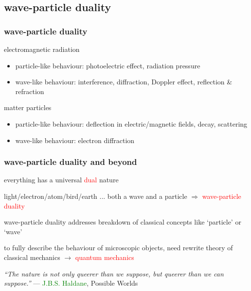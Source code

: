 \documentclass[12pt,xcolor=svgnames,handout]{beamer}
\newcommand{\keypoint}[1]{%
   \textcolor{red}{#1}%
}
\newcommand{\tightframetitle}[1]{ %
\frametitle{#1}\vspace{-.6\baselineskip}}
\begin{document}
\subsection{wave-particle duality}


\begin{frame}
	\tightframetitle{wave-particle duality}
	
	
	\begin{block}{electromagnetic radiation}
		\begin{itemize}
			\item particle-like behaviour: photoelectric effect, radiation pressure
			
			\item wave-like behaviour: interference, diffraction, Doppler effect, reflection \& refraction
		\end{itemize}
	\end{block}

\begin{block}{matter particles}
	\begin{itemize}
		\item particle-like behaviour: deflection in electric/magnetic fields, decay, scattering
		
		\item wave-like behaviour: electron diffraction
	\end{itemize}
\end{block}
	
\end{frame}



\begin{frame}
	\tightframetitle{wave-particle duality and beyond}
	
	\begin{block}{}
		everything has a universal \keypoint{dual} nature
			
		light/electron/atom/bird/earth ... both a wave and a particle $\Rightarrow$ \keypoint{wave-particle duality}
	\end{block}
		
	\begin{block}{}
		wave-particle duality addresses breakdown of classical concepts like `particle' or `wave'
		
		to fully describe the behaviour of microscopic objects, need rewrite theory of classical mechanics $\longrightarrow$ \keypoint{quantum mechanics}
	\end{block}
	
	
	\begin{block}{}
		\emph{``The nature is not only queerer than we suppose, but queerer than we can suppose.''}
		--- \textcolor{Green}{J.B.S. Haldane}, Possible Worlds
	\end{block}
	
\end{frame}
\end{document}
